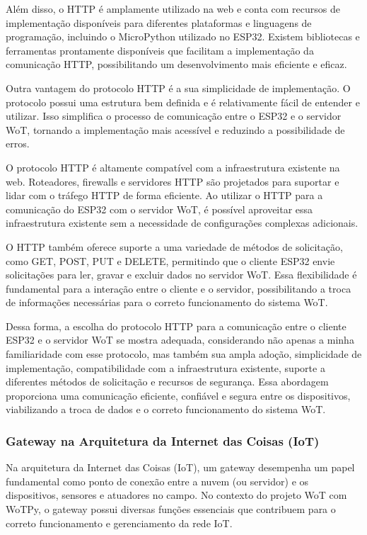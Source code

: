 Além disso, o HTTP é amplamente utilizado na web e conta com recursos de implementação disponíveis para diferentes plataformas e linguagens de programação, incluindo o MicroPython utilizado no ESP32. Existem bibliotecas e ferramentas prontamente disponíveis que facilitam a implementação da comunicação HTTP, possibilitando um desenvolvimento mais eficiente e eficaz.

Outra vantagem do protocolo HTTP é a sua simplicidade de implementação. O protocolo possui uma estrutura bem definida e é relativamente fácil de entender e utilizar. Isso simplifica o processo de comunicação entre o ESP32 e o servidor WoT, tornando a implementação mais acessível e reduzindo a possibilidade de erros.

O protocolo HTTP é altamente compatível com a infraestrutura existente na web. Roteadores, firewalls e servidores HTTP são projetados para suportar e lidar com o tráfego HTTP de forma eficiente. Ao utilizar o HTTP para a comunicação do ESP32 com o servidor WoT, é possível aproveitar essa infraestrutura existente sem a necessidade de configurações complexas adicionais.

O HTTP também oferece suporte a uma variedade de métodos de solicitação, como GET, POST, PUT e DELETE, permitindo que o cliente ESP32 envie solicitações para ler, gravar e excluir dados no servidor WoT. Essa flexibilidade é fundamental para a interação entre o cliente e o servidor, possibilitando a troca de informações necessárias para o correto funcionamento do sistema WoT.

Dessa forma, a escolha do protocolo HTTP para a comunicação entre o cliente ESP32 e o servidor WoT se mostra adequada, considerando não apenas a minha familiaridade com esse protocolo, mas também sua ampla adoção, simplicidade de implementação, compatibilidade com a infraestrutura existente, suporte a diferentes métodos de solicitação e recursos de segurança. Essa abordagem proporciona uma comunicação eficiente, confiável e segura entre os dispositivos, viabilizando a troca de dados e o correto funcionamento do sistema WoT.

\subsubsection{Gateway na Arquitetura da Internet das Coisas (IoT)}

Na arquitetura da Internet das Coisas (IoT), um gateway desempenha um papel fundamental como ponto de conexão entre a nuvem (ou servidor) e os dispositivos, sensores e atuadores no campo. No contexto do projeto WoT com WoTPy, o gateway possui diversas funções essenciais que contribuem para o correto funcionamento e gerenciamento da rede IoT.

